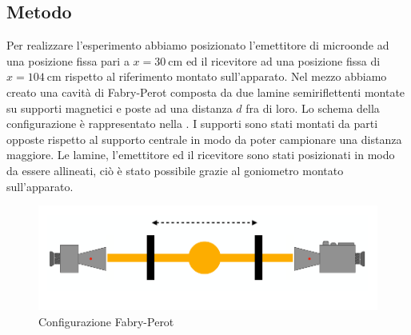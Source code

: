 \documentclass[a4paper]{article}
\begin{document}
\subsection{Metodo}
Per realizzare l'esperimento abbiamo posizionato l'emettitore di microonde ad una posizione fissa pari a $x=\SI{30}{\centi\metre}$ ed il ricevitore ad una posizione fissa di $x=\SI{104}{\centi\metre}$ rispetto al riferimento montato sull'apparato. Nel mezzo abbiamo creato una cavità di Fabry-Perot composta da due lamine semiriflettenti montate su supporti magnetici e poste ad una distanza $d$ fra di loro. Lo schema della configurazione è rappresentato nella . I supporti sono stati montati da parti opposte rispetto al supporto centrale in modo da poter campionare una distanza maggiore. Le lamine, l'emettitore ed il ricevitore sono stati posizionati in modo da essere allineati, ciò è stato possibile grazie al goniometro montato sull'apparato.
\begin{figure}[H]
    \centering
    \includegraphics[width=0.7\linewidth]{grafici/Fabry-Perot_configurazione.png}
    \caption{Configurazione Fabry-Perot}
    \label{fig:Configurazione_Fabry_Perot}
\end{figure}
\end{document}
